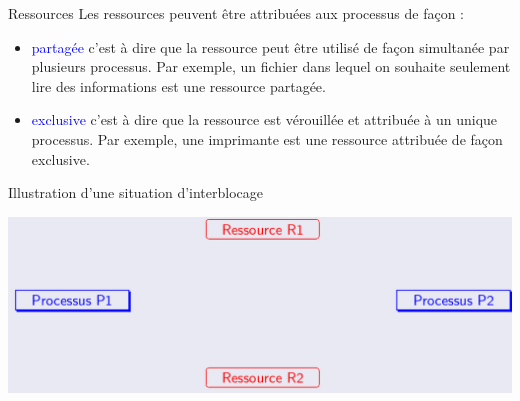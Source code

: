 \documentclass[10pt]{beamer}
\begin{document}
\begin{frame}
	\mframe{\Processus}
	\begin{block}{Ressources}
		Les ressources peuvent être attribuées aux processus de façon :
		\begin{itemize}[label=\textbullet]
			\item<2-> \textcolor{blue}{partagée} c'est à dire que la ressource peut être utilisé de façon simultanée par plusieurs processus.
			      \onslide<3-> Par exemple, un fichier dans lequel on souhaite seulement lire des informations est une ressource partagée.
			\item<4-> \textcolor{blue}{exclusive} c'est à dire que la ressource est vérouillée et attribuée à un unique processus.
			      \onslide<5-> Par exemple, une imprimante est une ressource attribuée de façon exclusive.
		\end{itemize}
	\end{block}
\end{frame}



\begin{frame}
	\mframe{\Processus}
	\setlength{\shadowsize}{1pt}
	\begin{block}{Illustration d'une situation d'interblocage}
	\begin{center}	
	\includegraphics[scale=0.25]{../../Archi_Materielle/data/blocage_1}
	\end{center}
\end{block}
\end{frame}
\end{document}

